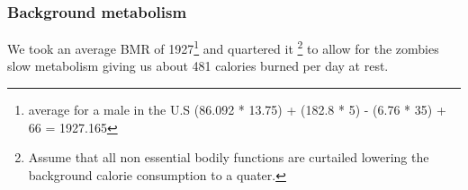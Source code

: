 \subsubsection{Background metabolism}
We took an average BMR of 1927\footnote{average for a male in the U.S (86.092 * 13.75) + (182.8 * 5) - (6.76 * 35) + 66 = 1927.165} and quartered it \footnote{Assume that all non essential bodily functions are curtailed lowering the background calorie consumption to a quater.} to allow for the zombies slow metabolism giving us about 481 calories burned per day at rest.
\endinput
